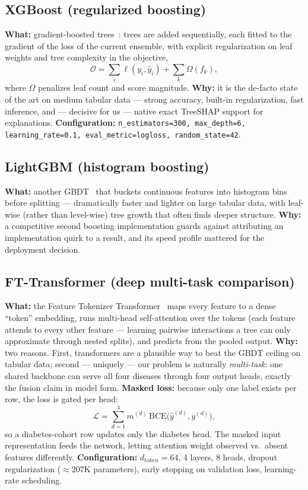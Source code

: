 \documentclass[journal]{IEEEtran}
\begin{document}
\subsection{XGBoost (regularized boosting)}
\textbf{What:} gradient-boosted trees~\cite{chen2016xgboost}: trees are added sequentially, each fitted to the gradient of the loss of the current ensemble, with explicit regularization on leaf weights and tree complexity in the objective,
\begin{equation}
\mathcal{O} = \sum_i \ell(y_i,\hat{y}_i) + \sum_k \Omega(f_k),
\end{equation}
where $\Omega$ penalizes leaf count and score magnitude. \textbf{Why:} it is the de-facto state of the art on medium tabular data --- strong accuracy, built-in regularization, fast inference, and --- decisive for us --- native exact TreeSHAP support for explanations. \textbf{Configuration:} \texttt{n\_estimators=300, max\_depth=6, learning\_rate=0.1, eval\_metric=logloss, random\_state=42}.

\subsection{LightGBM (histogram boosting)}
\textbf{What:} another GBDT~\cite{ke2017lightgbm} that buckets continuous features into histogram bins before splitting --- dramatically faster and lighter on large tabular data, with leaf-wise (rather than level-wise) tree growth that often finds deeper structure. \textbf{Why:} a competitive second boosting implementation guards against attributing an implementation quirk to a result, and its speed profile mattered for the deployment decision.

\subsection{FT-Transformer (deep multi-task comparison)}
\textbf{What:} the Feature Tokenizer Transformer~\cite{gorishniy2021revisiting} maps every feature to a dense ``token'' embedding, runs multi-head self-attention over the tokens (each feature attends to every other feature --- learning pairwise interactions a tree can only approximate through nested splits), and predicts from the pooled output. \textbf{Why:} two reasons. First, transformers are a plausible way to beat the GBDT ceiling on tabular data; second --- uniquely --- our problem is naturally \emph{multi-task}: one shared backbone can serve all four diseases through four output heads, exactly the fusion claim in model form. \textbf{Masked loss:} because only one label exists per row, the loss is gated per head:
\begin{equation}
\mathcal{L} = \sum_{d=1}^{4} m^{(d)}\,\mathrm{BCE}\big(\hat{y}^{(d)}, y^{(d)}\big),
\end{equation}
so a diabetes-cohort row updates only the diabetes head. The masked input representation feeds the network, letting attention weight observed vs.\ absent features differently. \textbf{Configuration:} $d_{token}{=}64$, 4 layers, 8 heads, dropout regularization ($\approx$207K parameters), early stopping on validation loss, learning-rate scheduling.
\end{document}
